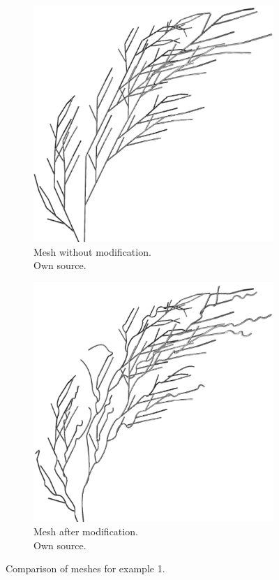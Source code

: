 \documentclass[b5paper,twoside,11pt]{article}
\begin{document}
\FloatBarrier
\begin{figure}[!htp]

\centering
\begin{subfigure}{.49\textwidth}
  \centering
  \includegraphics[width=0.8\linewidth]{siatka1}
\caption{Mesh without modification.\\Own source. \label{przyklad1.siatka}}
\end{subfigure}
\begin{subfigure}{.49\textwidth}
  \centering
  \includegraphics[width=0.8\linewidth]{siatkaMOD1}
\caption{Mesh after modification.\\Own source. \label{przyklad1.siatkaMOD}}
\end{subfigure}
\caption{Comparison of meshes for example  1.}
\label{przyklad1}
\end{figure}
\newpage
\end{document}
